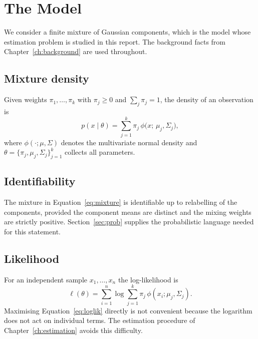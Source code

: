 \chapter{The Model}\label{ch:model}

We consider a finite mixture of Gaussian components, which is the model whose
estimation problem is studied in this report. The background facts from
Chapter~\ref{ch:background} are used throughout.

\section{Mixture density}\label{sec:mixture}

Given weights $\pi_1,\dots,\pi_k$ with $\pi_j\ge 0$ and $\sum_j \pi_j = 1$, the
density of an observation is
\begin{equation}\label{eq:mixture}
  p(x \mid \theta) = \sum_{j=1}^{k} \pi_j\, \phi\bigl(x;\,\mu_j,\Sigma_j\bigr),
\end{equation}
where $\phi(\cdot;\mu,\Sigma)$ denotes the multivariate normal density and
$\theta = \{\pi_j,\mu_j,\Sigma_j\}_{j=1}^{k}$ collects all parameters.

\lipsum[11-12]

\section{Identifiability}\label{sec:identifiability}

The mixture in Equation~\eqref{eq:mixture} is identifiable up to relabelling of
the components, provided the component means are distinct and the mixing
weights are strictly positive. Section~\ref{sec:prob} supplies the probabilistic
language needed for this statement.

\lipsum[13-14]

\section{Likelihood}\label{sec:likelihood}

For an independent sample $x_1,\dots,x_n$ the log-likelihood is
\begin{equation}\label{eq:loglik}
  \ell(\theta) = \sum_{i=1}^{n} \log \sum_{j=1}^{k} \pi_j\,\phi(x_i;\mu_j,\Sigma_j).
\end{equation}
Maximising Equation~\eqref{eq:loglik} directly is not convenient because the
logarithm does not act on individual terms. The estimation procedure of
Chapter~\ref{ch:estimation} avoids this difficulty.

